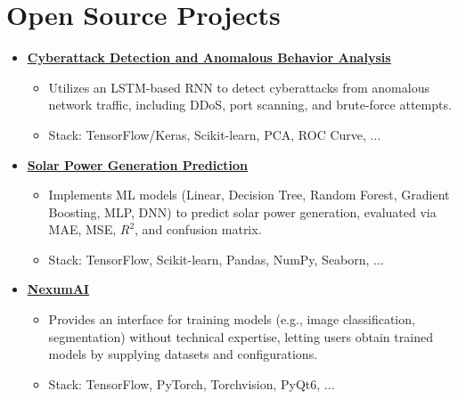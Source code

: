 \documentclass[letter,10pt]{article}
\newcommand{\customsquare}{\raisebox{0.25ex}{\scalebox{0.45}{$\blacksquare$}}}
\begin{document}
\section*{Open Source Projects}
\begin{itemize}[label={\customsquare}]
    \item \href{https://github.com/karami-mehdi/CyberattackDetection}{\underline{\textbf{Cyberattack Detection and Anomalous Behavior Analysis}}}
    \begin{itemize}
        \item Utilizes an LSTM-based RNN to detect cyberattacks from anomalous network traffic, including DDoS, port scanning, and brute-force attempts.
        \item Stack: TensorFlow/Keras, Scikit-learn, PCA, ROC Curve, ...
    \end{itemize}

    \item \href{https://github.com/karami-mehdi/SolarPowerGenerationAnalysis}{\underline{\textbf{Solar Power Generation Prediction}}}
    \begin{itemize}
        \item Implements ML models (Linear, Decision Tree, Random Forest, Gradient Boosting, MLP, DNN) to predict solar power generation, evaluated via MAE, MSE, $R^2$, and confusion matrix.
        \item Stack: TensorFlow, Scikit-learn, Pandas, NumPy, Seaborn, ...
    \end{itemize}

    \item \href{https://github.com/AINexumLab/NexumAI}{\underline{\textbf{NexumAI}}}
    \begin{itemize}
        \item Provides an interface for training models (e.g., image classification, segmentation) without technical expertise, letting users obtain trained models by supplying datasets and configurations.
        \item Stack: TensorFlow, PyTorch, Torchvision, PyQt6, ...
    \end{itemize}


\end{itemize}
\end{document}

